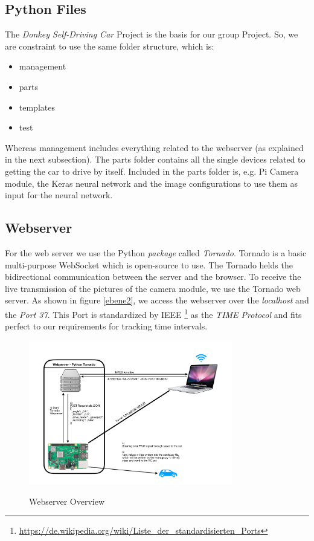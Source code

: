 \documentclass[journal]{IEEEtran}
\begin{document}
\subsection{Python Files}

The \textit{Donkey Self-Driving Car} \cite{donkey} Project is the basis for our group Project. So,  we are constraint to use the same folder structure, which is:

\begin{itemize}
\item management
\item parts
\item templates
\item test
\end{itemize}

Whereas management includes everything related to the webserver (as explained in the next subsection). The parts folder contains all the single devices related to getting the car to drive by itself. Included in the parts folder is, e.g. Pi Camera module, the Keras neural network and the image configurations to use them as input for the neural network. 

\subsection{Webserver}

For the web server we use the Python \textit{package} called \textit{Tornado}. Tornado is a basic multi-purpose WebSocket which is open-source to use. The Tornado helds the bidirectional communication between the server and the browser. To receive the live transmission of the pictures of the camera module, we use the Tornado web server. As shown in figure \ref{ebene2}, we access the webserver over the \textit{localhost} and the \textit{Port 37}. This Port is standardized by IEEE \footnote{\url{https://de.wikipedia.org/wiki/Liste_der_standardisierten_Ports}} as the \textit{TIME Protocol} and fits perfect to our requirements for tracking time intervals.

\begin{figure}
  \begin{center}
  \includegraphics[width=3.5in]{photo/webserver.pdf}\\
  \caption{Webserver Overview}\label{webserver}
  \end{center}
\end{figure}
\end{document}
